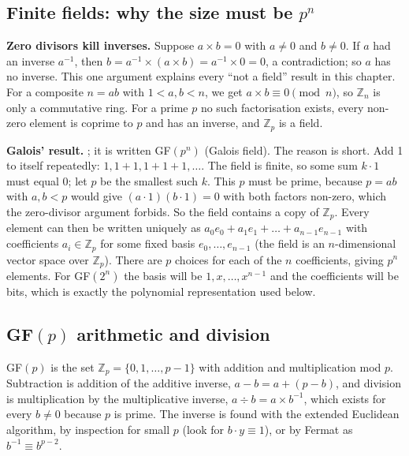 \subsection{Finite fields: why the size must be $p^n$}
\textbf{Zero divisors kill inverses.} Suppose $a \times b = 0$ with $a \ne 0$ and $b \ne 0$. If $a$ had an inverse $a^{-1}$, then $b = a^{-1} \times (a \times b) = a^{-1} \times 0 = 0$, a contradiction; so $a$ has no inverse. This one argument explains every ``not a field'' result in this chapter. For a composite $n = ab$ with $1 < a, b < n$, we get $a \times b \equiv 0 \pmod n$, so $\mathbb{Z}_n$ is only a commutative ring. For a prime $p$ no such factorisation exists, every non-zero element is coprime to $p$ and has an inverse, and $\mathbb{Z}_p$ is a field.

\textbf{Galois' result.} ; it is written GF$(p^n)$ (Galois field). The reason is short. Add 1 to itself repeatedly: $1, 1 + 1, 1 + 1 + 1, \dots$. The field is finite, so some sum $k \cdot 1$ must equal 0; let $p$ be the smallest such $k$. This $p$ must be prime, because $p = ab$ with $a, b < p$ would give $(a \cdot 1)(b \cdot 1) = 0$ with both factors non-zero, which the zero-divisor argument forbids. So the field contains a copy of $\mathbb{Z}_p$. Every element can then be written uniquely as $a_0 e_0 + a_1 e_1 + \dots + a_{n-1} e_{n-1}$ with coefficients $a_i \in \mathbb{Z}_p$ for some fixed basis $e_0, \dots, e_{n-1}$ (the field is an $n$-dimensional vector space over $\mathbb{Z}_p$). There are $p$ choices for each of the $n$ coefficients, giving $p^n$ elements. For GF$(2^n)$ the basis will be $1, x, \dots, x^{n-1}$ and the coefficients will be bits, which is exactly the polynomial representation used below.

\subsection{GF$(p)$ arithmetic and division \hot}
GF$(p)$ is the set $\mathbb{Z}_p = \{0, 1, \dots, p - 1\}$ with addition and multiplication mod $p$. Subtraction is addition of the additive inverse, $a - b = a + (p - b)$, and division is multiplication by the multiplicative inverse, $a \div b = a \times b^{-1}$, which exists for every $b \ne 0$ because $p$ is prime. The inverse is found with the extended Euclidean algorithm, by inspection for small $p$ (look for $b \cdot y \equiv 1$), or by Fermat as $b^{-1} \equiv b^{p-2}$.

